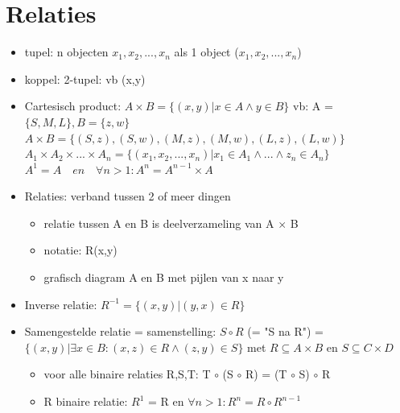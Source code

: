 \documentclass{article}
\begin{document}
\section{Relaties}
\begin{itemize}
    \item tupel: n objecten $x_{1},x_{2},...,x_{n}$ als 1 object ($x_{1},x_{2},...,x_{n}$)
    \item koppel: 2-tupel: vb (x,y)
    \item Cartesisch product: $A \times B = \{(x,y) | x \in A \land y \in B \}$ 
    \newline vb: A = $\{S,M,L\}, B = \{z,w\}$
    \newline $A \times B = \{(S,z),(S,w),(M,z),(M,w),(L,z),(L,w)\}$
    \newline $A_{1} \times A_{2} \times ... \times A_{n} = \{(x_1,x_2,...,x_n)|x_1 \in A_1 \land ... \land z_n \in A_n \}$
    \newline $A^1 = A \quad en \quad \forall n > 1 : A^n = A^{n-1} \times A$
    \item Relaties: verband tussen 2 of meer dingen
    \begin{itemize}
        \item relatie tussen A en B is deelverzameling van A $\times$ B
        \item notatie: R(x,y)
        \item grafisch diagram A en B met pijlen van x naar y
    \end{itemize}
    \item Inverse relatie: $R^{-1} = \{(x,y)|(y,x)\in R\}$
    \item Samengestelde relatie = samenstelling: $S \circ R$ (= "S na R") = $\{(x,y)|\exists x \in B:(x,z)\in R \land (z,y)\in S\}$ met $R\subseteq A \times B$ en $S\subseteq C \times D$
    \begin{itemize}
        \item voor alle binaire relaties R,S,T: T $\circ$ (S $\circ$ R) = (T $\circ$ S) $\circ$ R
        \item R binaire relatie: $R^1$ = R en $\forall n > 1: R^n = R \circ R^{n-1}$
    \end{itemize}
\end{itemize}
\end{document}
